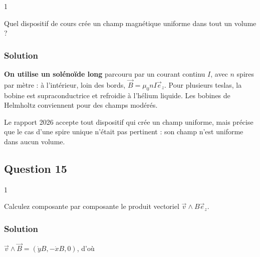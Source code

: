 \documentclass[11pt,a4paper]{article}
\newcommand{\equationajustee}[1]{%
  \sbox{\boiteequation}{$\displaystyle #1$}%
  \ifdim\wd\boiteequation>\linewidth
    \[\resizebox{\linewidth}{!}{\usebox{\boiteequation}}\]%
  \else
    \[#1\]%
  \fi}
\begin{document}
\begin{indication}{1}

Quel dispositif de cours crée un champ magnétique uniforme dans tout un volume ?

\end{indication}

\hypertarget{solution-13}{%
\subsubsection{Solution}\label{solution-13}}

\textbf{On utilise un solénoïde long} parcouru par un courant continu \(I\), avec \(n\) spires par mètre : à l'intérieur, loin des bords, \(\vec B=\mu_0nI\vec e_z\). Pour plusieurs teslas, la bobine est supraconductrice et refroidie à l'hélium liquide. Les bobines de Helmholtz conviennent pour des champs modérés.

\begin{piege}

Le rapport 2026 accepte tout dispositif qui crée un champ uniforme, mais précise que le cas d'une spire unique n'était pas pertinent : son champ n'est uniforme dans aucun volume.

\end{piege}

\hypertarget{question-15}{%
\subsection{Question 15}\label{question-15}}

\begin{indication}{1}

Calculez composante par composante le produit vectoriel \(\vec v\wedge B\vec e_z\).

\end{indication}

\hypertarget{solution-14}{%
\subsubsection{Solution}\label{solution-14}}

\(\vec v\wedge\vec B=(\dot yB,-\dot xB,0)\), d'où

\equationajustee{\boxed{\begin{aligned}
m\ddot x&=qB\dot y\\
m\ddot y&=-qB\dot x\\
m\ddot z&=0
\end{aligned}}}
\end{document}
